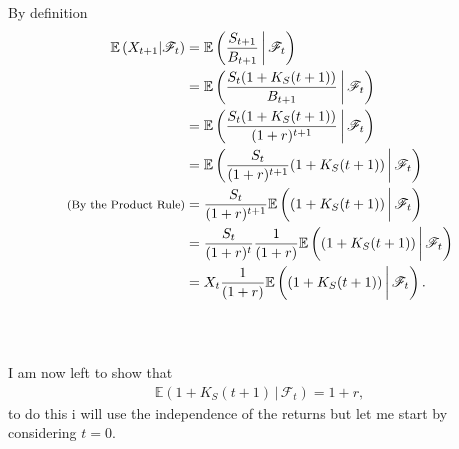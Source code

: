 \documentclass{beamer}
\numberwithin{equation}{section}
\begin{document}
\begin{frame}\frametitle{{\normalsize \secname} \\ {\large \subsecname}}
    By definition
    \begingroup
    \footnotesize
    \begin{align}
        \mathbb{E}\left(X_{t + 1} | \mathscr{F}_t\right) &= \mathbb{E}\left(\frac{S_{t + 1}}{B_{t + 1}} \, \bigg| \, \mathscr{F}_t\right) \\
        &= \mathbb{E}\left(\frac{S_{t}(1 + K_S(t + 1))}{B_{t + 1}} \, \bigg| \, \mathscr{F}_t\right) \\
        &= \mathbb{E}\left(\frac{S_{t}(1 + K_S(t + 1))}{(1 + r)^{t + 1}} \, \bigg| \, \mathscr{F}_t\right) \\
        &= \mathbb{E}\left(\frac{S_{t}}{(1 + r)^{t + 1}}(1 + K_S(t + 1)) \, \bigg| \, \mathscr{F}_t\right) \\
        \text{{\footnotesize (By the Product Rule)}} &= \frac{S_{t}}{(1 + r)^{t + 1}}\mathbb{E}\left((1 + K_S(t + 1)) \, \bigg| \, \mathscr{F}_t\right) \\
        &= \frac{S_{t}}{(1 + r)^{t}}\frac{1}{(1 + r)}\mathbb{E}\left((1 + K_S(t + 1)) \, \bigg| \, \mathscr{F}_t\right) \\
        &= X_t\frac{1}{(1 + r)}\mathbb{E}\left((1 + K_S(t + 1)) \, \bigg| \, \mathscr{F}_t\right).
    \end{align}
    \endgroup
\end{frame}

\begin{frame}\frametitle{{\normalsize \secname} \\ {\large \subsecname}}
    I am now left to show that
    \begin{align}
        \mathbb{E}\left(1 + K_S(t + 1) \, \bigg| \, \mathscr{F}_t\right) = 1 + r,
    \end{align}
    to do this i will use the independence of the returns but let me start by considering $t = 0$.
\end{frame}
\end{document}

